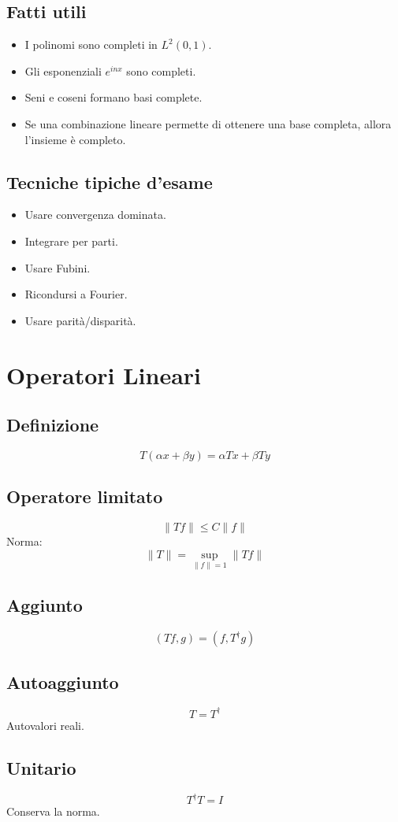 \documentclass[a4paper,10pt]{article}
\begin{document}
\subsection{Fatti utili}
\begin{itemize}
\item I polinomi sono completi in $L^2(0,1)$.
\item Gli esponenziali $e^{inx}$ sono completi.
\item Seni e coseni formano basi complete.
\item Se una combinazione lineare permette di ottenere una base completa, allora l'insieme è completo.
\end{itemize}
\subsection{Tecniche tipiche d'esame}
\begin{itemize}
\item Usare convergenza dominata.
\item Integrare per parti.
\item Usare Fubini.
\item Ricondursi a Fourier.
\item Usare parità/disparità.
\end{itemize}
\section{Operatori Lineari}
\subsection{Definizione}
\[T(\alpha x+\beta y)=\alpha Tx+\beta Ty\]
\subsection{Operatore limitato}
\[\|Tf\|\le C\|f\|\]
Norma:
\[\|T\|=\sup_{\|f\|=1}\|Tf\|\]
\subsection{Aggiunto}
\[(Tf,g)=(f,T^{\dagger}g)\]
\subsection{Autoaggiunto}
\[T=T^{\dagger}\]
Autovalori reali.
\subsection{Unitario}
\[T^{\dagger}T=I\]
Conserva la norma.
\end{document}
